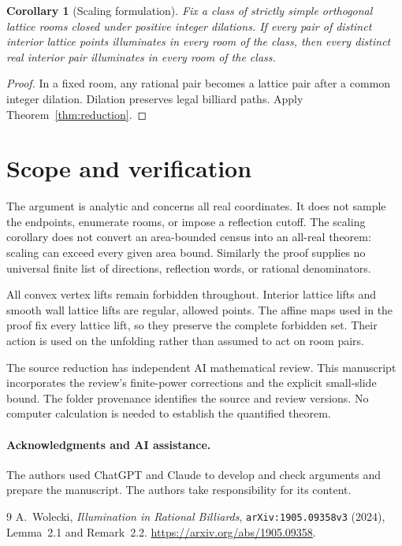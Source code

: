 \documentclass[11pt]{article}
\newtheorem{corollary}{Corollary}
\theoremstyle{remark}
\begin{document}
\begin{corollary}[Scaling formulation]\label{cor:scaling}
Fix a class of strictly simple orthogonal lattice rooms closed under
positive integer dilations. If every pair of distinct interior lattice
points illuminates in every room of the class, then every distinct real
interior pair illuminates in every room of the class.
\end{corollary}
\begin{proof}
In a fixed room, any rational pair becomes a lattice pair after a common
integer dilation. Dilation preserves legal billiard paths. Apply
Theorem~\ref{thm:reduction}.
\end{proof}

\section{Scope and verification}
The argument is analytic and concerns all real coordinates. It does not
sample the endpoints, enumerate rooms, or impose a reflection cutoff.
The scaling corollary does not convert an area-bounded census into an
all-real theorem: scaling can exceed every given area bound.
Similarly the proof supplies no universal finite list of directions,
reflection words, or rational denominators.

All convex vertex lifts remain forbidden throughout. Interior lattice lifts
and smooth wall lattice lifts are regular, allowed points. The affine maps
used in the proof fix every lattice lift, so they preserve the complete
forbidden set. Their action is used on the unfolding rather than assumed
to act on room pairs.

The source reduction has independent AI mathematical review. This manuscript
incorporates the review's finite-power corrections and the explicit small-slide
bound. The folder provenance identifies the source and review versions.
No computer calculation is needed to establish the quantified theorem.

\paragraph{Acknowledgments and AI assistance.}
The authors used ChatGPT and Claude to develop and check arguments and
prepare the manuscript. The authors take responsibility for its content.

\begin{thebibliography}{9}
A.~Wolecki, \emph{Illumination in Rational Billiards},
\texttt{arXiv:1905.09358v3} (2024), Lemma~2.1 and Remark~2.2.
\url{https://arxiv.org/abs/1905.09358}.
\end{thebibliography}
\end{document}

